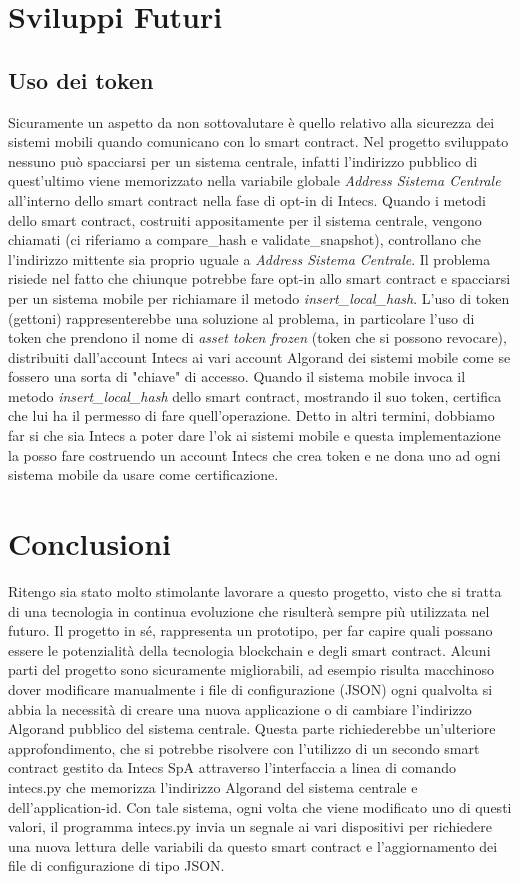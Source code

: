 \section{Sviluppi Futuri}

\subsection{Uso dei token}
Sicuramente un aspetto da non sottovalutare è quello relativo alla sicurezza dei sistemi mobili quando comunicano con lo smart contract. Nel progetto sviluppato nessuno può spacciarsi per un sistema centrale, infatti l'indirizzo pubblico di quest'ultimo viene memorizzato nella variabile globale \textit{Address Sistema Centrale} all'interno dello smart contract nella fase di opt-in di Intecs. Quando i metodi dello smart contract, costruiti appositamente per il sistema centrale, vengono chiamati (ci riferiamo a compare\_hash e validate\_snapshot), controllano che l'indirizzo mittente sia proprio uguale a \textit{Address Sistema Centrale}. Il problema risiede nel fatto che chiunque potrebbe fare opt-in allo smart contract e spacciarsi per un sistema mobile per richiamare il metodo \textit{insert\_local\_hash}. L'uso di token (gettoni) rappresenterebbe una soluzione al problema, in particolare l'uso di token che prendono il nome di \textit{asset token frozen} (token che si possono revocare), distribuiti dall'account Intecs ai vari account Algorand dei sistemi mobile come se fossero una sorta di "chiave" di accesso. Quando il sistema mobile invoca il metodo \textit{insert\_local\_hash} dello smart contract, mostrando il suo token, certifica che lui ha il permesso di fare quell'operazione. Detto in altri termini, dobbiamo far si che sia Intecs a poter dare l'ok ai sistemi mobile e questa implementazione la posso fare costruendo un account Intecs che crea token e ne dona uno ad ogni sistema mobile da usare come certificazione.

\section{Conclusioni}
Ritengo sia stato molto stimolante lavorare a questo progetto, visto che si tratta di una tecnologia in continua evoluzione che risulterà sempre più utilizzata nel futuro. Il progetto in sé, rappresenta un prototipo, per far capire quali possano essere le potenzialità della tecnologia blockchain e degli smart contract. Alcuni parti del progetto sono sicuramente migliorabili, ad esempio risulta macchinoso dover modificare manualmente i file di configurazione (JSON) ogni qualvolta si abbia la necessità di creare una nuova applicazione o di cambiare l'indirizzo Algorand pubblico del sistema centrale. Questa parte richiederebbe un'ulteriore approfondimento, che si potrebbe risolvere con l'utilizzo di un secondo smart contract gestito da Intecs SpA attraverso l'interfaccia a linea di comando intecs.py che memorizza l'indirizzo Algorand del sistema centrale e dell'application-id. Con tale sistema, ogni volta che viene modificato uno di questi valori, il programma intecs.py invia un segnale ai vari dispositivi per richiedere una nuova lettura delle variabili da questo smart contract e l'aggiornamento dei file di configurazione di tipo JSON.